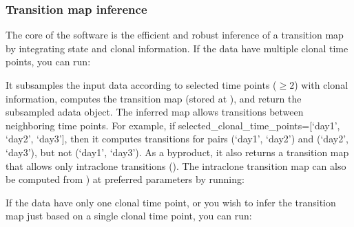 \documentclass[letterpaper,10pt,english]{sphinxmanual}
\begin{document}
\subsubsection{Transition map inference}
\label{\detokenize{getting_started:transition-map-inference}}
The core of the software is the efficient and robust inference of a transition map by integrating state and clonal information. If the data have multiple clonal time points, you can run:

\begin{sphinxVerbatim}[commandchars=\\\{\}]
\end{sphinxVerbatim}

It subsamples the input data according to selected time points (\(\ge 2\)) with clonal information, computes the transition map (stored at ), and return the subsampled adata object. The inferred map allows transitions between neighboring time points. For example, if selected\_clonal\_time\_points={[}‘day1’, ‘day2’, ‘day3’{]}, then it computes transitions for pairs (‘day1’, ‘day2’) and (‘day2’, ‘day3’), but not (‘day1’, ‘day3’). As a byproduct, it also returns a transition map that allows only intra\sphinxhyphen{}clone transitions (). The intra\sphinxhyphen{}clone transition map can also be computed from ) at preferred parameters by running:

\begin{sphinxVerbatim}[commandchars=\\\{\}]
\end{sphinxVerbatim}

If the data have only one clonal time point, or you wish to infer the transition map just based on a single clonal time point, you can run:

\begin{sphinxVerbatim}[commandchars=\\\{\}]
 
\end{sphinxVerbatim}
\end{document}
